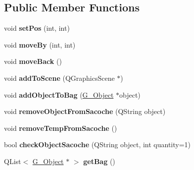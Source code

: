 \subsection*{Public Member Functions}
\begin{DoxyCompactItemize}
\item 
\hypertarget{class_p___penguin_a975a333a6bc304033d42096f77b852b9}{}void {\bfseries set\+Pos} (int, int)\label{class_p___penguin_a975a333a6bc304033d42096f77b852b9}

\item 
\hypertarget{class_p___penguin_a6ede466f053aaa278e22c3ee3086c6d3}{}void {\bfseries move\+By} (int, int)\label{class_p___penguin_a6ede466f053aaa278e22c3ee3086c6d3}

\item 
\hypertarget{class_p___penguin_a43760ce2774c4b4e5a212dd6f55584be}{}void {\bfseries move\+Back} ()\label{class_p___penguin_a43760ce2774c4b4e5a212dd6f55584be}

\item 
\hypertarget{class_p___penguin_aa0179befedb5e603878b1504f80382a9}{}void {\bfseries add\+To\+Scene} (Q\+Graphics\+Scene $\ast$)\label{class_p___penguin_aa0179befedb5e603878b1504f80382a9}

\item 
\hypertarget{class_p___penguin_a4e7bd1a96017c2db2cba6fb6e76626ba}{}void {\bfseries add\+Object\+To\+Bag} (\hyperlink{class_g___object}{G\+\_\+\+Object} $\ast$object)\label{class_p___penguin_a4e7bd1a96017c2db2cba6fb6e76626ba}

\item 
\hypertarget{class_p___penguin_aecd5baac5c781982fdc66b1affd22505}{}void {\bfseries remove\+Object\+From\+Sacoche} (Q\+String object)\label{class_p___penguin_aecd5baac5c781982fdc66b1affd22505}

\item 
\hypertarget{class_p___penguin_ab1f84ebc59ef3212539999318276035e}{}void {\bfseries remove\+Temp\+From\+Sacoche} ()\label{class_p___penguin_ab1f84ebc59ef3212539999318276035e}

\item 
\hypertarget{class_p___penguin_a24142a69bc79472ff66c7f823a0dea00}{}bool {\bfseries check\+Object\+Sacoche} (Q\+String object, int quantity=1)\label{class_p___penguin_a24142a69bc79472ff66c7f823a0dea00}

\item 
\hypertarget{class_p___penguin_aa3f3676f29a389382e623749c16d4d70}{}Q\+List$<$ \hyperlink{class_g___object}{G\+\_\+\+Object} $\ast$ $>$ {\bfseries get\+Bag} ()\label{class_p___penguin_aa3f3676f29a389382e623749c16d4d70}


\end{DoxyCompactItemize}
